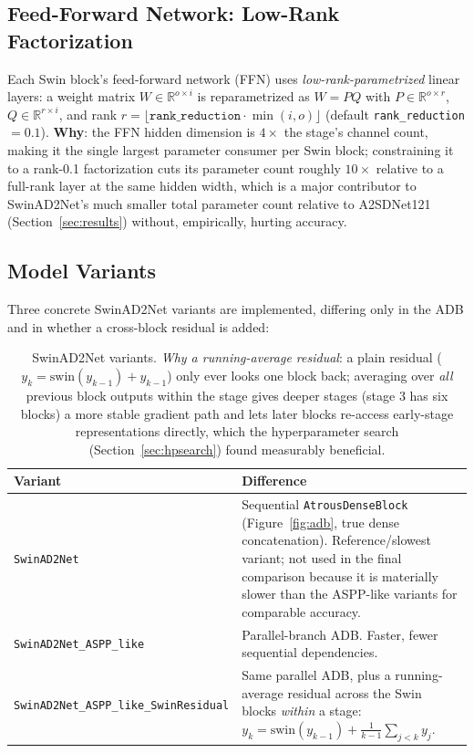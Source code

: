 \documentclass[10pt,twocolumn]{article}
\newcommand{\code}[1]{\texttt{\small #1}}
\begin{document}
\subsection{Feed-Forward Network: Low-Rank Factorization}
Each Swin block's feed-forward network (FFN) uses \emph{low-rank-parametrized} linear layers: a weight matrix $W \in \mathbb{R}^{o \times i}$ is reparametrized as $W = PQ$ with $P \in \mathbb{R}^{o \times r}$, $Q \in \mathbb{R}^{r \times i}$, and rank $r = \lfloor \texttt{rank\_reduction} \cdot \min(i,o) \rfloor$ (default \code{rank\_reduction}$=0.1$). \textbf{Why}: the FFN hidden dimension is $4\times$ the stage's channel count, making it the single largest parameter consumer per Swin block; constraining it to a rank-0.1 factorization cuts its parameter count roughly $10\times$ relative to a full-rank layer at the same hidden width, which is a major contributor to SwinAD2Net's much smaller total parameter count relative to A2SDNet121 (Section~\ref{sec:results}) without, empirically, hurting accuracy.

\subsection{Model Variants}
\label{sec:variants}
Three concrete SwinAD2Net variants are implemented, differing only in the ADB and in whether a cross-block residual is added:

\begin{table}[t]
\centering\small
\begin{tabular}{@{}p{}p{}@{}}
\toprule
\textbf{Variant} & \textbf{Difference} \\
\midrule
\code{SwinAD2Net} & Sequential \code{AtrousDenseBlock} (Figure~\ref{fig:adb}, true dense concatenation). Reference/slowest variant; not used in the final comparison because it is materially slower than the ASPP-like variants for comparable accuracy. \\[5pt]
\code{SwinAD2Net\_ASPP\_like} & Parallel-branch ADB. Faster, fewer sequential dependencies. \\[5pt]
\code{SwinAD2Net\_ASPP\_like\_}\newline\code{SwinResidual} & Same parallel ADB, plus a running-average residual across the Swin blocks \emph{within} a stage: $y_k = \text{swin}(y_{k-1}) + \tfrac{1}{k-1}\sum_{j<k} y_j$. \\
\bottomrule
\end{tabular}
\caption{SwinAD2Net variants. \emph{Why a running-average residual}: a plain residual ($y_k = \text{swin}(y_{k-1}) + y_{k-1}$) only ever looks one block back; averaging over \emph{all} previous block outputs within the stage gives deeper stages (stage 3 has six blocks) a more stable gradient path and lets later blocks re-access early-stage representations directly, which the hyperparameter search (Section~\ref{sec:hpsearch}) found measurably beneficial.}
\label{tab:variants}
\end{table}
\end{document}
